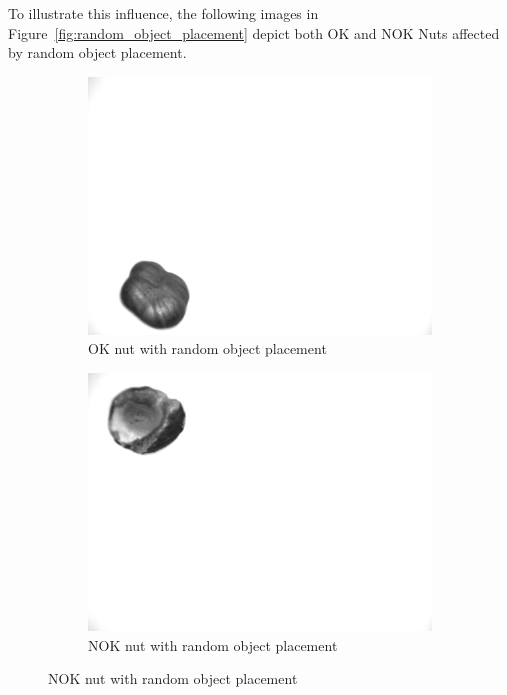 \documentclass[12pt,DIV14,BCOR12mm,a4paper,footinclude=false,headinclude,parskip=half-,twoside,openright,cleardoublepage=empty,toc=index,bibliography=totoc,listof=totoc]{scrreprt}
\numberwithin{equation}{chapter}
\begin{document}
\begin{enumerate}
	To illustrate this influence, the following images in Figure~\ref{fig:random_object_placement} depict both OK and NOK Nuts affected by random object placement.

	\begin{figure}
		\centering
		\begin{subfigure}[b]{0.45\textwidth}
			\centering
			\includegraphics[scale=0.15]{../media/Nuts-influence-random-OK.png}
			\caption{OK nut with random object placement}
		\end{subfigure}
		\hfill
		\begin{subfigure}[b]{0.45\textwidth}
			\centering
			\includegraphics[scale=0.15]{../media/Nuts-influence-random-NOK.png}
			\caption{NOK nut with random object placement}

\end{subfigure}
\end{figure}
\end{enumerate}
\end{document}
